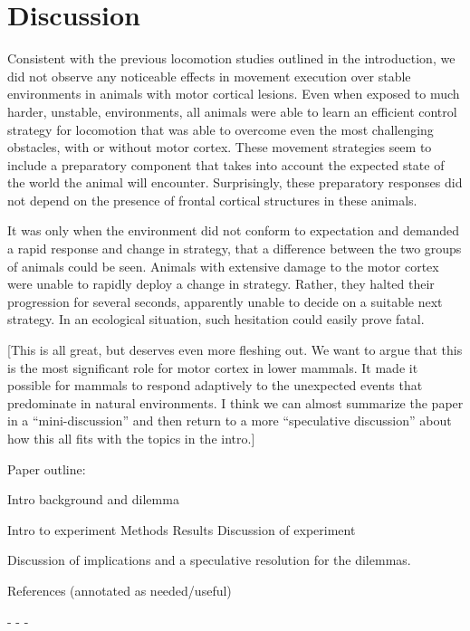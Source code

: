 \section{Discussion}

Consistent with the previous locomotion studies outlined in the introduction, we did not observe any noticeable effects in movement execution over stable environments in animals with motor cortical lesions. Even when exposed to much harder, unstable, environments, all animals were able to learn an efficient control strategy for locomotion that was able to overcome even the most challenging obstacles, with or without motor cortex. These movement strategies seem to include a preparatory component that takes into account the expected state of the world the animal will encounter. Surprisingly, these preparatory responses did not depend on the presence of frontal cortical structures in these animals.

It was only when the environment did not conform to expectation and demanded a rapid response and change in strategy, that a difference between the two groups of animals could be seen. Animals with extensive damage to the motor cortex were unable to rapidly deploy a change in strategy. Rather, they halted their progression for several seconds, apparently unable to decide on a suitable next strategy. In an ecological situation, such hesitation could easily prove fatal.

[This is all great, but deserves even more fleshing out. We want to argue that this is the most significant role for motor cortex in lower mammals. It made it possible for mammals to respond adaptively to the unexpected events that predominate in natural environments. I think we can almost summarize the paper in a “mini-discussion” and then return to a more “speculative discussion” about how this all fits with the topics in the intro.]

Paper outline:

Intro background and dilemma

Intro to experiment
Methods
Results
Discussion of experiment

Discussion of implications and a speculative resolution for the dilemmas.

References (annotated as needed/useful)

- - -


